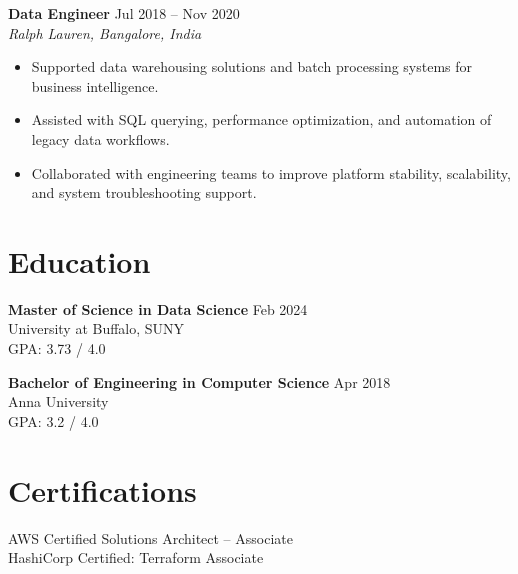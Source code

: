 \documentclass[10pt]{article}
\begin{document}
\textbf{Data Engineer} \hfill Jul 2018 -- Nov 2020 \\
\textit{Ralph Lauren, Bangalore, India}
\begin{itemize}[leftmargin=*, itemsep=3pt]
    \item Supported data warehousing solutions and batch processing systems for business intelligence.
    \item Assisted with SQL querying, performance optimization, and automation of legacy data workflows.
    \item Collaborated with engineering teams to improve platform stability, scalability, and system troubleshooting support.
\end{itemize}

\section*{Education}

\textbf{Master of Science in Data Science} \hfill Feb 2024 \\
University at Buffalo, SUNY \\
GPA: 3.73 / 4.0

\textbf{Bachelor of Engineering in Computer Science} \hfill Apr 2018 \\
Anna University \\
GPA: 3.2 / 4.0

\section*{Certifications}
AWS Certified Solutions Architect – Associate \\
HashiCorp Certified: Terraform Associate
\end{document}
